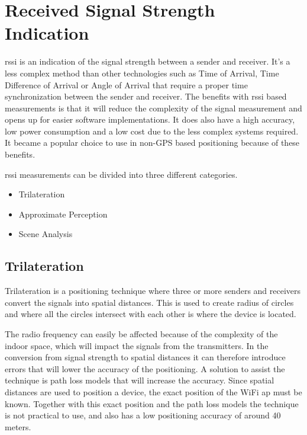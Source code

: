 \section{Received Signal Strength Indication}\label{sec:theoryRssi}
\acrfull{rssi} is an indication of the signal strength between a sender and receiver.
It's a less complex method than other technologies such as Time of Arrival, Time Difference of Arrival or
Angle of Arrival that require a proper time synchronization between the sender and receiver.
The benefits with \acrshort{rssi} based measurements is that it will reduce the complexity of the signal measurement and opens up for easier software implementations.
It does also have a high accuracy, low power consumption and a low cost due to the less complex systems required.
It became a popular choice to use in non-GPS based positioning because of these benefits.\cite{IndoorFingerprintPositioning2017, PerformanceAnalysisDiverse2013}

\bigskip

\acrshort{rssi} measurements can be divided into three different categories.

\begin{itemize}
	\item Trilateration
	\item Approximate Perception
	\item Scene Analysis \cite{IndoorFingerprintPositioning2017}
\end{itemize}

\subsection{Trilateration}\label{sec:theoryRssiTrilateration} Trilateration
is a positioning technique where three or more senders and receivers convert the signals
into spatial distances.  This is used to create radius of circles and where all
the circles intersect with each other is where the device is located.
\cite{IndoorFingerprintPositioning2017} 

\bigskip

The radio frequency can easily be affected because of the complexity of the indoor space, which will impact the signals from the transmitters.
In the conversion from signal strength to spatial distances it can therefore introduce errors that will lower the accuracy of the positioning.
A solution to assist the technique is path loss models that will increase the accuracy.
Since spatial distances are used to position a device, the exact position of the WiFi \acrfull{ap} must be known.
Together with this exact position and the path loss models the technique is not practical to use, and also has a low positioning accuracy of around 40 meters.\cite{IndoorFingerprintPositioning2017}


